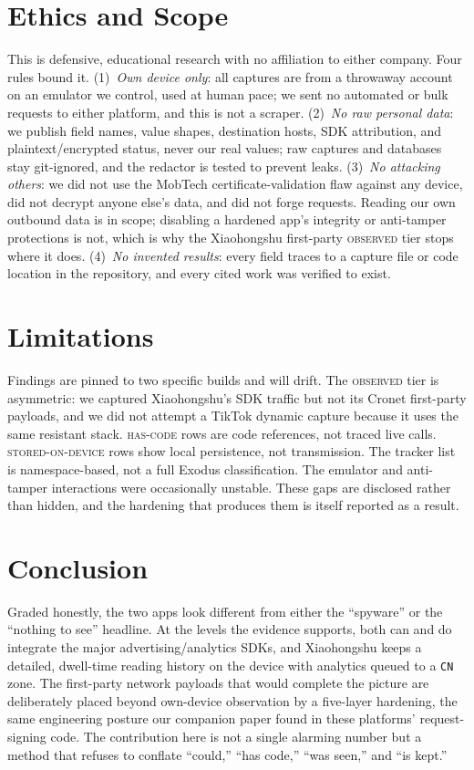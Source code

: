 \documentclass[conference,10pt]{IEEEtran}
\newcommand{\code}[1]{\texttt{\small #1}}
\newcommand{\hascode}{\textsc{has-code}}
\newcommand{\observed}{\textsc{observed}}
\newcommand{\stored}{\textsc{stored-on-device}}
\begin{document}
\section{Ethics and Scope}
This is defensive, educational research with no affiliation to either company. Four rules bound it. (1)~\emph{Own device only}: all captures are from a throwaway account on an emulator we control, used at human pace; we sent no automated or bulk requests to either platform, and this is not a scraper. (2)~\emph{No raw personal data}: we publish field names, value shapes, destination hosts, SDK attribution, and plaintext/encrypted status, never our real values; raw captures and databases stay git-ignored, and the redactor is tested to prevent leaks. (3)~\emph{No attacking others}: we did not use the MobTech certificate-validation flaw against any device, did not decrypt anyone else's data, and did not forge requests. Reading our own outbound data is in scope; disabling a hardened app's integrity or anti-tamper protections is not, which is why the Xiaohongshu first-party \observed{} tier stops where it does. (4)~\emph{No invented results}: every field traces to a capture file or code location in the repository, and every cited work was verified to exist.

\section{Limitations}
Findings are pinned to two specific builds and will drift. The \observed{} tier is asymmetric: we captured Xiaohongshu's SDK traffic but not its Cronet first-party payloads, and we did not attempt a TikTok dynamic capture because it uses the same resistant stack. \hascode{} rows are code references, not traced live calls. \stored{} rows show local persistence, not transmission. The tracker list is namespace-based, not a full Exodus classification. The emulator and anti-tamper interactions were occasionally unstable. These gaps are disclosed rather than hidden, and the hardening that produces them is itself reported as a result.

\section{Conclusion}
Graded honestly, the two apps look different from either the ``spyware'' or the ``nothing to see'' headline. At the levels the evidence supports, both can and do integrate the major advertising/analytics SDKs, and Xiaohongshu keeps a detailed, dwell-time reading history on the device with analytics queued to a \code{CN} zone. The first-party network payloads that would complete the picture are deliberately placed beyond own-device observation by a five-layer hardening, the same engineering posture our companion paper found in these platforms' request-signing code. The contribution here is not a single alarming number but a method that refuses to conflate ``could,'' ``has code,'' ``was seen,'' and ``is kept.''
\end{document}
